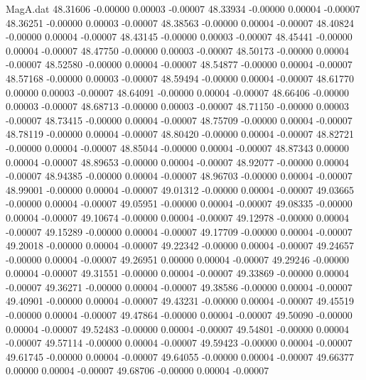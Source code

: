 \begin{filecontents}{MagA.dat}
  48.31606   -0.00000    0.00003   -0.00007
  48.33934   -0.00000    0.00004   -0.00007
  48.36251   -0.00000    0.00003   -0.00007
  48.38563   -0.00000    0.00004   -0.00007
  48.40824   -0.00000    0.00004   -0.00007
  48.43145   -0.00000    0.00003   -0.00007
  48.45441   -0.00000    0.00004   -0.00007
  48.47750   -0.00000    0.00003   -0.00007
  48.50173   -0.00000    0.00004   -0.00007
  48.52580   -0.00000    0.00004   -0.00007
  48.54877   -0.00000    0.00004   -0.00007
  48.57168   -0.00000    0.00003   -0.00007
  48.59494   -0.00000    0.00004   -0.00007
  48.61770    0.00000    0.00003   -0.00007
  48.64091   -0.00000    0.00004   -0.00007
  48.66406   -0.00000    0.00003   -0.00007
  48.68713   -0.00000    0.00003   -0.00007
  48.71150   -0.00000    0.00003   -0.00007
  48.73415   -0.00000    0.00004   -0.00007
  48.75709   -0.00000    0.00004   -0.00007
  48.78119   -0.00000    0.00004   -0.00007
  48.80420   -0.00000    0.00004   -0.00007
  48.82721   -0.00000    0.00004   -0.00007
  48.85044   -0.00000    0.00004   -0.00007
  48.87343    0.00000    0.00004   -0.00007
  48.89653   -0.00000    0.00004   -0.00007
  48.92077   -0.00000    0.00004   -0.00007
  48.94385   -0.00000    0.00004   -0.00007
  48.96703   -0.00000    0.00004   -0.00007
  48.99001   -0.00000    0.00004   -0.00007
  49.01312   -0.00000    0.00004   -0.00007
  49.03665   -0.00000    0.00004   -0.00007
  49.05951   -0.00000    0.00004   -0.00007
  49.08335   -0.00000    0.00004   -0.00007
  49.10674   -0.00000    0.00004   -0.00007
  49.12978   -0.00000    0.00004   -0.00007
  49.15289   -0.00000    0.00004   -0.00007
  49.17709   -0.00000    0.00004   -0.00007
  49.20018   -0.00000    0.00004   -0.00007
  49.22342   -0.00000    0.00004   -0.00007
  49.24657   -0.00000    0.00004   -0.00007
  49.26951    0.00000    0.00004   -0.00007
  49.29246   -0.00000    0.00004   -0.00007
  49.31551   -0.00000    0.00004   -0.00007
  49.33869   -0.00000    0.00004   -0.00007
  49.36271   -0.00000    0.00004   -0.00007
  49.38586   -0.00000    0.00004   -0.00007
  49.40901   -0.00000    0.00004   -0.00007
  49.43231   -0.00000    0.00004   -0.00007
  49.45519   -0.00000    0.00004   -0.00007
  49.47864   -0.00000    0.00004   -0.00007
  49.50090   -0.00000    0.00004   -0.00007
  49.52483   -0.00000    0.00004   -0.00007
  49.54801   -0.00000    0.00004   -0.00007
  49.57114   -0.00000    0.00004   -0.00007
  49.59423   -0.00000    0.00004   -0.00007
  49.61745   -0.00000    0.00004   -0.00007
  49.64055   -0.00000    0.00004   -0.00007
  49.66377    0.00000    0.00004   -0.00007
  49.68706   -0.00000    0.00004   -0.00007

\end{filecontents}
